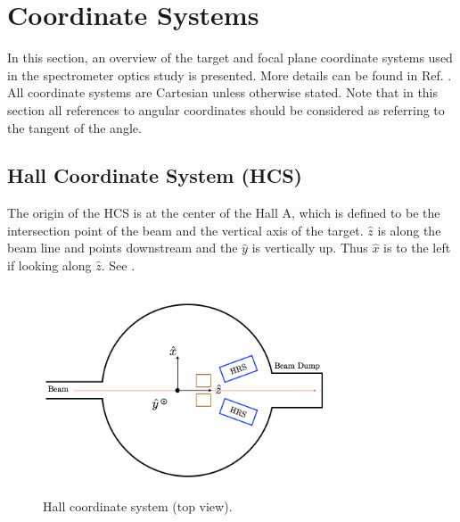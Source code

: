 \section{Coordinate Systems}
\label{C6S1}

In this section, an overview of the target and focal plane coordinate systems used in the spectrometer optics study is presented. More details can be found in Ref. \cite{Liyanage2002}. All coordinate systems are Cartesian unless otherwise stated. Note that in this section all references to angular coordinates should be considered as referring to the tangent of the angle.

\subsection[Hall Coordinate System]{Hall Coordinate System (HCS)}
\label{C6S1SS1}

The origin of the HCS is at the center of the Hall A, which is defined to be the intersection point of the beam and the vertical axis of the target. $\hat{z}$ is along the beam line and points downstream and the $\hat{y}$ is vertically up. Thus $\hat{x}$ is to the left if looking along $\hat{z}$. See .

\begin{figure}[p!]
  \centering
  \includegraphics[width=0.75\textwidth]{figs/HCS.png}
  \caption[Hall coordinate system.]{Hall coordinate system (top view). \label{C6S1F1}}
\end{figure}

